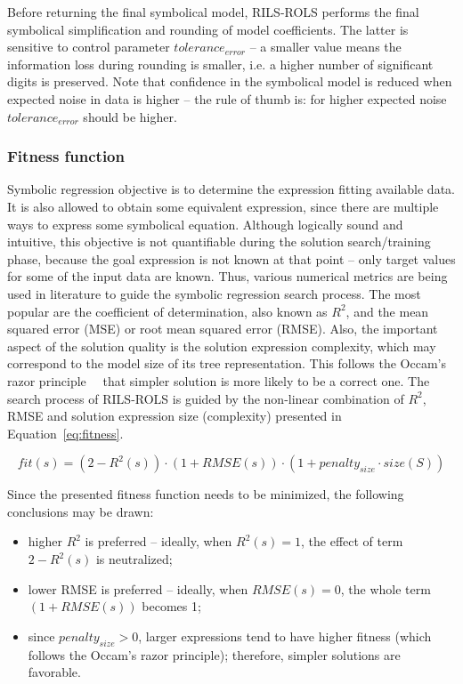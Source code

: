 \documentclass[a4paper,12pt]{elsarticle}
\begin{document}
Before returning the final symbolical model, \textsc{RILS}-\textsc{ROLS}  performs the final symbolical simplification and rounding of model coefficients. The latter is sensitive to control parameter $tolerance_{error}$ -- a smaller value means the information loss during rounding is smaller, i.e. a higher number of significant digits is preserved. Note that confidence in the symbolical model is reduced when expected noise in data is higher -- the rule of thumb is: for higher expected noise $tolerance_{error}$ should be higher. 


\subsubsection{Fitness function}\label{sec:fitness}

Symbolic regression objective is to determine the expression fitting available data. It is also allowed to obtain some equivalent expression, since there are multiple ways to express some symbolical equation. Although logically sound and intuitive, this objective is not quantifiable during the solution search/training phase, because the goal expression is not known at that point -- only target values for some of the input data are known. Thus, various numerical metrics are being used in literature to guide the symbolic regression search process. The most popular are the coefficient of determination, also known as $R^2$, and the mean squared error (MSE) or root mean squared error (RMSE). Also, the important aspect of the solution quality is the solution expression complexity, which may correspond to the model size of its tree representation. This follows the Occam's razor principle~\cite{costa2020fast}~ that simpler solution  is more likely to be a correct one. 
The search process of \textsc{RILS}-\textsc{ROLS}  is guided by the non-linear combination of $R^2$, RMSE and solution expression size (complexity) presented in Equation~\ref{eq:fitness}. 
 
\begin{equation}
	\label{eq:fitness}
	fit(s) = (2-R^2(s)) \cdot (1+RMSE(s)) \cdot (1+penalty_{size} \cdot size(S))
\end{equation}

Since the presented fitness function needs to be minimized, the following conclusions may be drawn:
\begin{itemize}
	\item higher $R^2$ is preferred -- ideally, when $R^2(s)=1$, the effect of term $2-R^2(s)$ is neutralized; %
	\item lower RMSE is preferred -- ideally, when $RMSE(s)=0$, the whole term $(1+RMSE(s))$ becomes 1;
	\item since $penalty_{size} > 0$, larger expressions tend to have higher fitness (which follows the Occam's razor principle); therefore, simpler solutions are favorable. 
\end{itemize}
\end{document}
